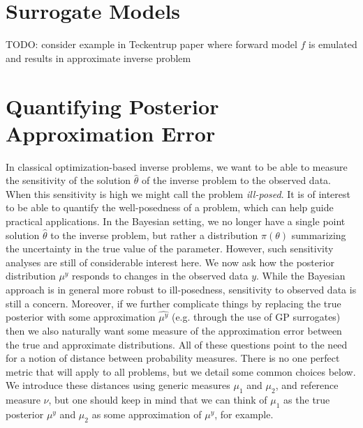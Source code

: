 \documentclass[12pt]{article}
\begin{document}
\section{Surrogate Models}
TODO: consider example in Teckentrup paper where forward model $f$ is emulated and results in approximate inverse problem 

\section{Quantifying Posterior Approximation Error}
In classical optimization-based inverse problems, we want to be able to measure the sensitivity of the solution $\hat{\theta}$ of the inverse problem to the observed data. When this sensitivity is high we might call the 
problem \textit{ill-posed}. It is of interest to be able to quantify the well-posedness of a problem, which can help guide practical applications. In the Bayesian setting, we no longer have a single point solution 
$\hat{\theta}$ to the inverse problem, but rather a distribution $\pi(\theta)$ summarizing the uncertainty in the true value of the parameter. However, such sensitivity analyses are still of considerable interest here. We now 
ask how the posterior distribution $\mu^y$ responds to changes in the observed data $y$. While the Bayesian approach is in general more robust to ill-posedness, sensitivity to observed data is still a concern. Moreover, if we further complicate things by replacing the true posterior with some approximation $\hat{\mu^y}$ (e.g. through the use of GP surrogates) then we also naturally want some measure of the approximation error between the true and approximate distributions. All of these questions point to the need for a notion of distance between probability measures. There is no one perfect metric that will apply to all problems, but we detail some common choices below. We introduce these distances using generic measures $\mu_1$ and $\mu_2$, and reference measure $\nu$, but one should keep in mind that we can think of $\mu_1$ as the true posterior 
$\mu^y$ and $\mu_2$ as some approximation of $\mu^y$, for example.  
\end{document}
